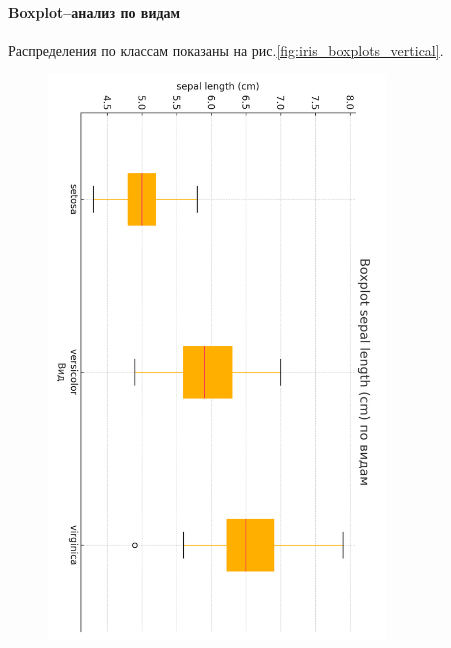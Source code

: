 \paragraph{Boxplot–анализ по видам}
Распределения по классам показаны на рис.\ref{fig:iris_boxplots_vertical}.
\begin{figure}[H]
  \centering
  \includegraphics[width=0.8\textwidth]{images/box_sepal_length_cm_cb2.png}\\[6pt]

\end{figure}

